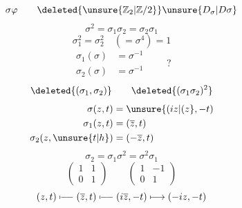 \[
\sigma\varphi
\qquad \deleted{\unsure{\mathbb Z_2|\mathbb Z/2}}\unsure{D_\sigma|D\sigma}
\]
\[
\boxed{\sigma^2=\sigma_1\sigma_2=\boxed{\sigma_2\sigma_1}}
\]
\[
\sigma_1^2=\sigma_2^2\quad(=\sigma^4)=1
\]
\[
\begin{aligned}
\sigma_1(\sigma)&=\sigma^{-1}\\
\sigma_2(\sigma)&=\sigma^{-1}
\end{aligned}\qquad ?
\]
\[
\deleted{(\sigma_1,\sigma_2)}\qquad\deleted{(\sigma_1\sigma_2)^2}
\]
\[
\begin{aligned}
\sigma(z,t)&=\unsure{(iz|(z},-t)\\
\sigma_1(z,t)&=(\overline z,t)\\
\sigma_2(z,\unsure{t|h})&=(-\overline z,t)
\end{aligned}
\]
\[
\sigma_2=\sigma_1\sigma^2=\sigma^2\sigma_1
\]
\[
\begin{pmatrix}1&1\\0&1\end{pmatrix}\qquad
\begin{pmatrix}1&-1\\0&1\end{pmatrix}
\]
\[
(z,t)\mathrel{\mapstochar\! -\! -}(\overline z,t)
 \mathrel{\mapstochar\! -\! -}(i\overline z,-t)
 \longmapsto(-iz,-t)
\]
